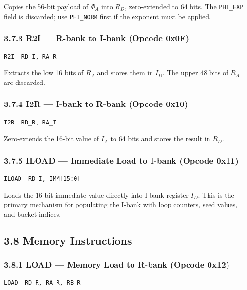 Copies the 56-bit payload of \(\Phi_A\) into \(R_D\), zero-extended
to 64 bits. The \texttt{PHI\_EXP} field is discarded; use
\texttt{PHI\_NORM} first if the exponent must be applied.

\subsubsection{3.7.3 R2I --- R-bank to I-bank (Opcode 0x0F)}

\begin{verbatim}
R2I  RD_I, RA_R
\end{verbatim}

Extracts the low 16 bits of \(R_A\) and stores them in
\(I_D\). The upper 48 bits of \(R_A\) are discarded.

\subsubsection{3.7.4 I2R --- I-bank to R-bank (Opcode 0x10)}

\begin{verbatim}
I2R  RD_R, RA_I
\end{verbatim}

Zero-extends the 16-bit value of \(I_A\) to 64 bits and stores
the result in \(R_D\).

\subsubsection{3.7.5 ILOAD --- Immediate Load to I-bank (Opcode 0x11)}

\begin{verbatim}
ILOAD  RD_I, IMM[15:0]
\end{verbatim}

Loads the 16-bit immediate value directly into I-bank register
\(I_D\). This is the primary mechanism for populating the I-bank
with loop counters, seed values, and bucket indices.

\subsection{3.8 Memory Instructions}\label{fa_71:memory-instructions}

\subsubsection{3.8.1 LOAD --- Memory Load to R-bank (Opcode 0x12)}

\begin{verbatim}
LOAD  RD_R, RA_R, RB_R
\end{verbatim}

